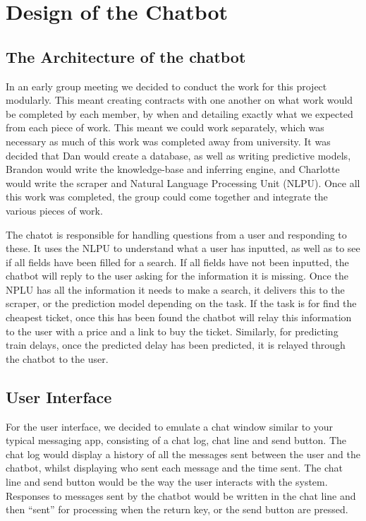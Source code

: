 \documentclass[11pt]{article}
\begin{document}
	
	\section{Design of the Chatbot}	 \label {Design}
	
	\subsection{The Architecture of the chatbot}
	
	In an early group meeting we decided to conduct the work for this project modularly. This meant creating contracts with one another on what work would be completed by each member, by when and detailing exactly what we expected from each piece of work. This meant we could work separately, which was necessary as much of this work was completed away from university. It was decided that Dan would create a database, as well as writing predictive models, Brandon would write the knowledge-base and inferring engine, and Charlotte would write the scraper and Natural Language Processing Unit (NLPU). Once all this work was completed, the group could come together and integrate the various pieces of work. 
	
	
	The chatot is responsible for handling questions from a user and responding to these. It uses the NLPU to understand what a user has inputted, as well as to see if all fields have been filled for a search. If all fields have not been inputted, the chatbot will reply to the user asking for the information it is missing. Once the NPLU has all the information it needs to make a search, it delivers this to the scraper, or the prediction model depending on the task. If the task is for find the cheapest ticket, once this has been found the chatbot will relay this information to the user with a price and a link to buy the ticket. Similarly, for predicting train delays, once the predicted delay has been predicted, it is relayed through the chatbot to the user.
	
	\subsection{User Interface} 
	For the user interface, we decided to emulate a chat window similar to your typical messaging app, consisting of a chat log, chat line and send button. The chat log would display a history of all the messages sent between the user and the chatbot, whilst displaying who sent each message and the time sent. The chat line and send button would be the way the user interacts with the system. Responses to messages sent by the chatbot would be written in the chat line and then “sent” for processing when the return key, or the send button are pressed.	
	
\end{document}
